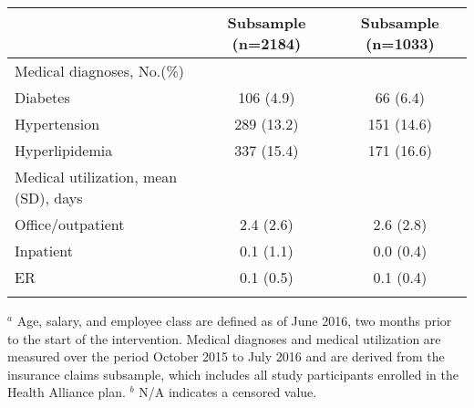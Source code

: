 \documentclass{article}
\begin{document}
\begin{table}[tbp]
\begin{tabularx}{\linewidth}{lCC}
\hspace{1em} &Subsample (n=2184)&Subsample (n=1033) \tabularnewline
\midrule Medical diagnoses, No.(\%)&& \tabularnewline
\hspace{1em} Diabetes&106  (4.9)&66  (6.4) \tabularnewline
\hspace{1em} Hypertension&289  (13.2)&151  (14.6) \tabularnewline
\hspace{1em} Hyperlipidemia&337  (15.4)&171  (16.6) \tabularnewline
Medical utilization, mean (SD), days&& \tabularnewline
\hspace{1em} Office/outpatient&2.4  (2.6)&2.6  (2.8) \tabularnewline
\hspace{1em} Inpatient&0.1  (1.1)&0.0  (0.4) \tabularnewline
\hspace{1em} ER&0.1  (0.5)&0.1  (0.4) \tabularnewline
\bottomrule \addlinespace[\belowrulesep]

\end{tabularx}
\begin{flushleft}
\footnotesize $^{a}$ Age, salary, and employee class are defined as of June 2016, two months prior to the start of the intervention. Medical diagnoses and medical utilization are measured over the period October 2015 to July 2016 and are derived from the insurance claims subsample, which includes all study participants enrolled in the Health Alliance plan. \newline $^{b}$ N/A indicates a censored value.
\end{flushleft}
\end{table}
\end{document}
